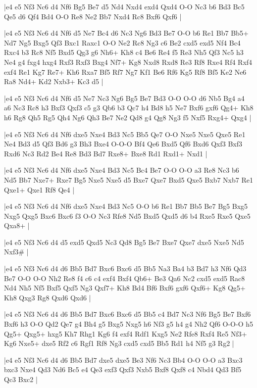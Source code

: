 \whitename{}
\blackname{}
\makegametitle
|e4 e5 Nf3 Nc6 d4 Nf6 Bg5 Be7 d5 Nd4 Nxd4 exd4 Qxd4 O-O Nc3 b6 Bd3 Bc5 Qe5 d6 Qf4 Bd4 O-O Re8 Ne2 Bb7 Nxd4 Rc8 Bxf6 Qxf6  |

\whitename{}
\blackname{}
\makegametitle
|e4 e5 Nf3 Nc6 d4 Nf6 d5 Ne7 Bc4 d6 Nc3 Ng6 Bd3 Be7 O-O b6 Re1 Bb7 Bb5+ Nd7 Ng5 Bxg5 Qf3 Bxc1 Raxc1 O-O Ne2 Rc8 Ng3 c6 Be2 cxd5 exd5 Nf4 Bc4 Rxc4 b3 Rc8 Nf5 Bxd5 Qg3 g6 Nh6+ Kh8 c4 Be6 Re4 f5 Re3 Nh5 Qf3 Nc5 h3 Ne4 g4 fxg4 hxg4 Rxf3 Rxf3 Bxg4 Nf7+ Kg8 Nxd8 Rxd8 Re3 Rf8 Rxe4 Rf4 Rxf4 exf4 Re1 Kg7 Re7+ Kh6 Rxa7 Bf5 Rf7 Ng7 Kf1 Be6 Rf6 Kg5 Rf8 Bf5 Ke2 Ne6 Ra8 Nd4+ Kd2 Nxb3+ Kc3 d5  |

\whitename{}
\blackname{}
\makegametitle
|e4 e5 Nf3 Nc6 d4 Nf6 d5 Ne7 Nc3 Ng6 Bg5 Be7 Bd3 O-O O-O d6 Nb5 Bg4 a4 a6 Nc3 Rc8 h3 Bxf3 Qxf3 c5 g3 Qb6 b3 Qc7 h4 Bd8 h5 Ne7 Bxf6 gxf6 Qg4+ Kh8 h6 Rg8 Qh5 Rg5 Qh4 Ng6 Qh3 Be7 Ne2 Qd8 g4 Qg8 Ng3 f5 Nxf5 Rxg4+ Qxg4  |

\whitename{}
\blackname{}
\makegametitle
|e4 e5 Nf3 Nc6 d4 Nf6 dxe5 Nxe4 Bd3 Nc5 Bb5 Qe7 O-O Nxe5 Nxe5 Qxe5 Re1 Ne4 Bd3 d5 Qf3 Bd6 g3 Bh3 Bxe4 O-O-O Bf4 Qe6 Bxd5 Qf6 Bxd6 Qxf3 Bxf3 Rxd6 Nc3 Rd2 Be4 Re8 Bd3 Bd7 Rxe8+ Bxe8 Rd1 Rxd1+ Nxd1  |

\whitename{}
\blackname{}
\makegametitle
|e4 e5 Nf3 Nc6 d4 Nf6 dxe5 Nxe4 Bd3 Nc5 Bc4 Be7 O-O O-O a3 Re8 Nc3 b6 Nd5 Bb7 Nxe7+ Rxe7 Bg5 Nxe5 Nxe5 d5 Bxe7 Qxe7 Bxd5 Qxe5 Bxb7 Nxb7 Re1 Qxe1+ Qxe1 Rf8 Qe4  |

\whitename{}
\blackname{}
\makegametitle
|e4 e5 Nf3 Nc6 d4 Nf6 dxe5 Nxe4 Bd3 Nc5 O-O b6 Re1 Bb7 Bb5 Be7 Bg5 Bxg5 Nxg5 Qxg5 Bxc6 Bxc6 f3 O-O Nc3 Rfe8 Nd5 Bxd5 Qxd5 d6 b4 Rxe5 Rxe5 Qxe5 Qxa8+  |

\whitename{}
\blackname{}
\makegametitle
|e4 e5 Nf3 Nc6 d4 d5 exd5 Qxd5 Nc3 Qd8 Bg5 Be7 Bxe7 Qxe7 dxe5 Nxe5 Nd5 Nxf3\#  |

\whitename{}
\blackname{}
\makegametitle
|e4 e5 Nf3 Nc6 d4 d6 Bb5 Bd7 Bxc6 Bxc6 d5 Bb5 Na3 Ba4 b3 Bd7 h3 Nf6 Qd3 Be7 O-O O-O Nh2 Re8 f4 c6 c4 exf4 Bxf4 Qb6+ Be3 Qa6 Nc2 cxd5 exd5 Rac8 Nd4 Nh5 Nf5 Bxf5 Qxf5 Ng3 Qxf7+ Kh8 Bd4 Bf6 Bxf6 gxf6 Qxf6+ Kg8 Qg5+ Kh8 Qxg3 Rg8 Qxd6 Qxd6  |

\whitename{}
\blackname{}
\makegametitle
|e4 e5 Nf3 Nc6 d4 d6 Bb5 Bd7 Bxc6 Bxc6 d5 Bb5 c4 Bd7 Nc3 Nf6 Bg5 Be7 Bxf6 Bxf6 h3 O-O Qd2 Qe7 g4 Bh4 g5 Bxg5 Nxg5 h6 Nf3 g5 h4 g4 Nh2 Qf6 O-O-O h5 Qg5+ Qxg5+ hxg5 Kh7 Rhg1 Kg6 f4 exf4 Rdf1 Kxg5 Ne2 Rfe8 Rxf4 Re5 Nf3+ Kg6 Nxe5+ dxe5 Rf2 c6 Rgf1 Rf8 Ng3 cxd5 cxd5 Bb5 Rd1 h4 Nf5 g3 Rg2  |

\whitename{}
\blackname{}
\makegametitle
|e4 e5 Nf3 Nc6 d4 d6 Bb5 Bd7 dxe5 dxe5 Be3 Nf6 Nc3 Bb4 O-O O-O a3 Bxc3 bxc3 Nxe4 Qd3 Nd6 Bc5 e4 Qe3 exf3 Qxf3 Nxb5 Bxf8 Qxf8 c4 Nbd4 Qd3 Bf5 Qc3 Bxc2  |

